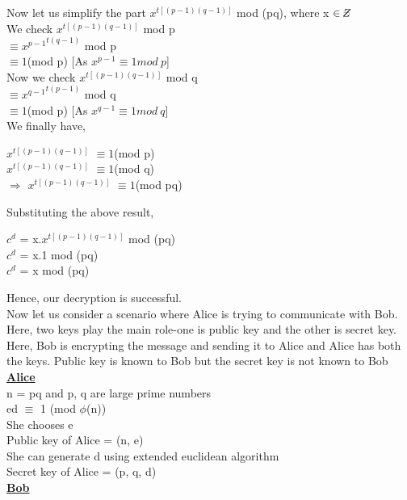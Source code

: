 \documentclass[11pt]{article}
\newcommand{\zbar}{\raisebox{0.2ex}{--}\kern-0.6em Z}
\begin{document}
Now let us simplify the part $x^{t[(p-1)(q-1)]}$ mod (pq), where x $\in \zbar$ \\
We check $x^{t[(p-1)(q-1)]}$ mod p\\
    $\equiv {x^{p-1}}^{t(q-1)}$ mod p\\
    $\equiv 1 $(mod p) [As $x^{p-1} \equiv 1 mod\ p$]\\
Now we check $x^{t[(p-1)(q-1)]}$ mod q\\
    $\equiv {x^{q-1}}^{t(p-1)}$ mod q\\
    $\equiv 1 $(mod p) [As $x^{q-1} \equiv 1 mod\ q$]\\
\vspace{3mm}
We finally have,\\
\begin{center}
    $x^{t[(p-1)(q-1)]}$ $\equiv 1 $(mod p)\\
    $x^{t[(p-1)(q-1)]}$ $\equiv 1 $(mod q)\\
    $\Rightarrow$ $x^{t[(p-1)(q-1)]}$ $\equiv 1 $(mod pq)\\
\end{center}
Substituting the above result, 
\begin{center}
     $c^d$ = x.$x^{t[(p-1)(q-1)]}$ mod (pq)\\
      $c^d$ = x.1 mod (pq)\\
      $c^d$ = x mod (pq)\\
\end{center}
Hence, our decryption is successful.\\
\vspace{3mm}
Now let us consider a scenario where Alice is trying to communicate with Bob. Here, two keys play the main role-one is public key and the other is secret key.\\
Here, Bob is encrypting the message and sending it to Alice and Alice has both the keys. Public key is known to Bob but the secret key is not known to Bob\\
\textbf{\underline{Alice}}\\
n = pq and p, q are large prime numbers\\
ed $\equiv$ 1 (mod $\phi$(n))\\
She chooses e\\
Public key of Alice = (n, e)\\
She can generate d using extended euclidean algorithm\\
Secret key of Alice = (p, q, d)\\
\textbf{\underline{Bob}}\\
\end{document}
